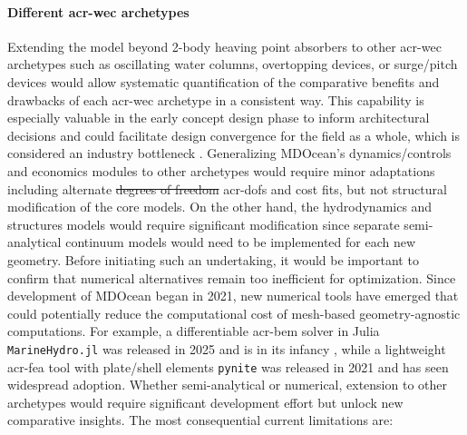 \documentclass[a4paper,fleqn,colorlinks,unicode,lineno]{cas-dc} %
\makeatletter
\providecommand{\DIFdeltex}[1]{{\protect\color{red}\sout{#1}}} %
\providecommand{\DIFaddbegin}{} %
\providecommand{\DIFaddend}{} %
\providecommand{\DIFdelbegin}{} %
\providecommand{\DIFdelend}{} %
\providecommand{\DIFdel}[1]{\texorpdfstring{\DIFdeltex{#1}}{}} %
\providecommand{\DIFscaledelfig}{0.5}
\newlength{\DIFdelgraphicswidth} %
\newlength{\DIFdelgraphicsheight} %
\providecommand{\DIFaddincludegraphics}[2][]{{\color{blue}\fbox{\DIFOincludegraphics[#1]{#2}}}} %
\providecommand{\DIFdelincludegraphics}[2][]{%
\sbox{\DIFdelgraphicsbox}{\DIFOincludegraphics[#1]{#2}}%
\settoboxwidth{\DIFdelgraphicswidth}{\DIFdelgraphicsbox} %
\settoboxtotalheight{\DIFdelgraphicsheight}{\DIFdelgraphicsbox} %
\scalebox{\DIFscaledelfig}{%
\parbox[b]{\DIFdelgraphicswidth}{\usebox{\DIFdelgraphicsbox}\\[-\baselineskip] \rule{\DIFdelgraphicswidth}{0em}}\llap{\resizebox{\DIFdelgraphicswidth}{\DIFdelgraphicsheight}{%
\setlength{\unitlength}{\DIFdelgraphicswidth}%
\begin{picture}(1,1)%
\thicklines\linethickness{2pt} %
{\color[rgb]{1,0,0}\put(0,0){\framebox(1,1){}}}%
{\color[rgb]{1,0,0}\put(0,0){\line( 1,1){1}}}%
{\color[rgb]{1,0,0}\put(0,1){\line(1,-1){1}}}%
\end{picture}%
}\hspace*{3pt}}} %
} %
\DeclareRobustCommand{\DIFaddbegin}{\DIFOaddbegin \let\includegraphics\DIFaddincludegraphics} %
\DeclareRobustCommand{\DIFaddend}{\DIFOaddend \let\includegraphics\DIFOincludegraphics} %
\DeclareRobustCommand{\DIFdelbegin}{\DIFOdelbegin \let\includegraphics\DIFdelincludegraphics} %
\DeclareRobustCommand{\DIFdelend}{\DIFOaddend \let\includegraphics\DIFOincludegraphics} %
\let\sout@orig\sout %
\renewcommand{\sout}[1]{\ifmmode\text{\sout@orig{\ensuremath{#1}}}\else\sout@orig{#1}\fi} %
\makeatother
\begin{document}
    \paragraph{Different \gls{acr-wec} archetypes}
    Extending the model beyond 2-body heaving point absorbers to other \gls{acr-wec} archetypes such as oscillating water columns, overtopping devices, or surge/pitch devices would allow systematic quantification of the comparative benefits and drawbacks of each \gls{acr-wec} archetype in a consistent way.
    This capability is especially valuable in the early concept design phase to inform architectural decisions and could facilitate design convergence for the field as a whole, which is considered an industry bottleneck \citep{caio_tackling_2019}.
    Generalizing MDOcean's dynamics/controls and economics modules to other archetypes would require minor adaptations including alternate \DIFdelbegin \DIFdel{degrees of freedom }\DIFdelend \DIFaddbegin \glspl{acr-dof} \DIFaddend and cost fits, but not structural modification of the core models.
    On the other hand, the hydrodynamics and structures models would require significant modification since separate semi-analytical continuum models would need to be implemented for each new geometry.
    Before initiating such an undertaking, it would be important to confirm that numerical alternatives remain too inefficient for optimization.
    Since development of MDOcean began in 2021, new numerical tools have emerged that could potentially reduce the computational cost of mesh-based geometry-agnostic computations.
    For example, a differentiable \gls{acr-bem} solver in Julia \texttt{MarineHydro.jl} was released in 2025 and is in its infancy \citep{khanal_fully_2025}, while a lightweight \gls{acr-fea} tool with plate/shell elements \texttt{pynite} was released in 2021 and has seen widespread adoption.
    Whether semi-analytical or numerical, extension to other archetypes would require significant development effort but unlock new comparative insights.
\else
    The most consequential current limitations are:
\end{document}

